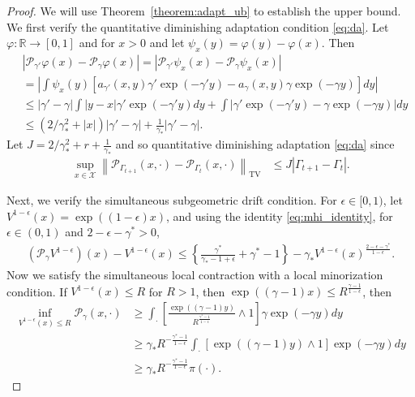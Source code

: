 \documentclass[12pt]{article}
\theoremstyle{plain}
\theoremstyle{remark}
\newcommand{\norm}[1]{\left\lVert#1\right\rVert}
\newcommand{\e}{\epsilon}
\newcommand{\R}{\mathbb{R}}
\renewcommand{\P}{\mathcal{P}}
\newcommand{\X}{\mathcal{X}}
\let\temp\phi
\let\phi\varphi
\let\varphi\temp
\newcommand{\eq}[1]{\begin{align*}#1\end{align*}}
\begin{document}
\begin{proof}
We will use Theorem~\ref{theorem:adapt_ub} to establish the upper bound.
We first verify the quantitative diminishing adaptation condition \eqref{eq:da}.
Let $\phi : \R \to [0, 1]$ and for $x > 0$ and let $\psi_x(y) = \phi(y) - \phi(x)$. 
Then
\eq{
&\left| \P_{\gamma'}\phi(x) - \P_{\gamma}\phi(x) \right|
= \left| \P_{\gamma'}\psi_x(x) - \P_{\gamma}\psi_x(x) \right|
\\
&= \left| \int \psi_x(y) \left[ a_{\gamma'}(x, y) \gamma' \exp(-\gamma' y)
- a_{\gamma}(x, y) \gamma \exp(-\gamma y) \right] dy \right|
\\
&\le |\gamma' - \gamma| \int |y - x| \gamma' \exp(-\gamma' y) dy
+ \int |\gamma' \exp(-\gamma' y) - \gamma \exp(-\gamma y)| dy
\\
&\le (2/\gamma_*^2 + |x|) |\gamma' - \gamma|
+ \frac{1}{\gamma_*} |\gamma' - \gamma|.
}
Let $J = 2/\gamma_*^2 + r + \frac{1}{\gamma_*}$ and so quantitative diminishing adaptation \eqref{eq:da} since
\begin{align*}
\sup_{x \in \X} \norm{\P_{\Gamma_{t + 1}}(x, \cdot) - \P_{\Gamma_t}(x, \cdot)}_{\text{TV}}
&\le J |\Gamma_{t + 1} - \Gamma_{t}|.
\end{align*}

Next, we verify the simultaneous subgeometric drift condition. 
For $\e \in [0, 1)$, let $V^{1-\e}(x) = \exp( (1-\e) x)$, and using the identity \eqref{eq:mhi_identity}, for $\e \in (0, 1)$ and $2 - \e - \gamma^* > 0$,
\eq{
(\P_\gamma V^{1 - \e})(x) - V^{1 - \e}(x)
\le 
\left\{
\frac{\gamma^*}{\gamma_* - 1 + \e}
+ \gamma^* - 1
\right\}  
- \gamma_* V^{1-\e}(x)^{\frac{2 - \e - \gamma^*}{1 - \e}}.
}
Now we satisfy the simultaneous local contraction with a local minorization condition.
If $V^{1-\e}(x) \le R$ for $R > 1$, then $\exp((\gamma - 1) x) \le R^{\frac{\gamma - 1}{1-\e}}$, then
\begin{align*}
\inf_{ V^{1-\e}(x) \le R } \P_\gamma(x, \cdot)
&\ge \int_{\cdot} \left[ \frac{\exp((\gamma - 1)y)}{R^{\frac{\gamma^* - 1}{1-\e}}} \wedge 1 \right] \gamma \exp(-\gamma y) dy
\\
&\ge \gamma_* R^{-\frac{\gamma^* - 1}{1-\e}} \int_{\cdot} \left[ \exp((\gamma - 1)y) \wedge 1 \right] \exp(-\gamma y) dy
\\
&\ge \gamma_* R^{-\frac{\gamma^* - 1}{1-\e}}
\pi(\cdot).
\end{align*}
\end{proof}
\end{document}
